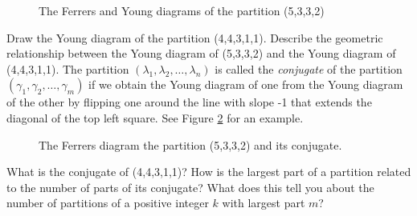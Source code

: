 {\begin{figure}[htb]\caption{The Ferrers
and Young diagrams of the partition
(5,3,3,2)}\label{FerrersYoung}
\begin{center} \end{center}
\end{figure}
\bp
\iteme Draw the Young diagram of the partition (4,4,3,1,1).  Describe the
geometric relationship between the Young diagram of (5,3,3,2) and the
Young diagram of (4,4,3,1,1).
\iteme The partition $(\lambda_1,\lambda_2,\ldots, \lambda_n)$ is called
the {\em conjugate} of the partition
$(\gamma_1,\gamma_2,\ldots, \gamma_m)$ if we obtain the Young diagram of
one from the Young diagram of the other by flipping one around the line
with slope -1 that extends the diagonal of the top left square.  See Figure
\ref{conjugateYoung} for an example.
\begin{figure}[htb]\caption{The Ferrers
diagram the partition
(5,3,3,2) and its conjugate.}\label{conjugateYoung}
\begin{center} \end{center}
\end{figure}  
What is the conjugate of
(4,4,3,1,1)?  How is the largest part of a partition related to the
number of parts of its conjugate?  What does this tell you about the
number of partitions of a positive integer $k$ with largest part $m$?

}
